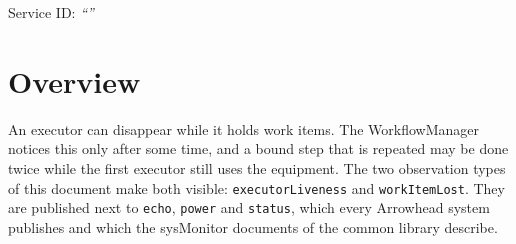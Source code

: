\documentclass[a4paper]{arrowhead}
\begin{document}
\ArrowheadSetup

\begin{center}
  \vspace*{1cm}
  \huge{\arrowtitle}

  \vspace*{0.2cm}
  \LARGE{\arrowtype}
  \vspace*{1cm}

  \Large{Service ID: \textit{``\arrowid''}}
  \vspace*{\fill}

  

  \vspace*{1cm}
  \vspace*{\fill}

  \begin{abstract}
    This document describes the \texttt{sysMonitor} service of the Eclipse Arrowhead workflow support systems, which publishes observations of the WorkflowManager, here its own observation types about lost and suspected executors. It is provided by the WorkflowManager system, service version 1.0.0, documentation edition 5.4.0.
  \end{abstract}

  \vspace*{1cm}
\end{center}

\newpage

\tableofcontents
\newpage

\section{Overview}
\label{sec:overview}
An executor can disappear while it holds work items. The WorkflowManager notices this only after some time, and a
bound step that is repeated may be done twice while the first executor still uses the equipment. The two observation
types of this document make both visible: \texttt{executor\allowbreak{}Liveness} and \texttt{workItemLost}. They are published next to
\texttt{echo}, \texttt{power} and \texttt{status}, which every Arrowhead system publishes and which the sysMonitor
documents of the common library describe.
\end{document}
